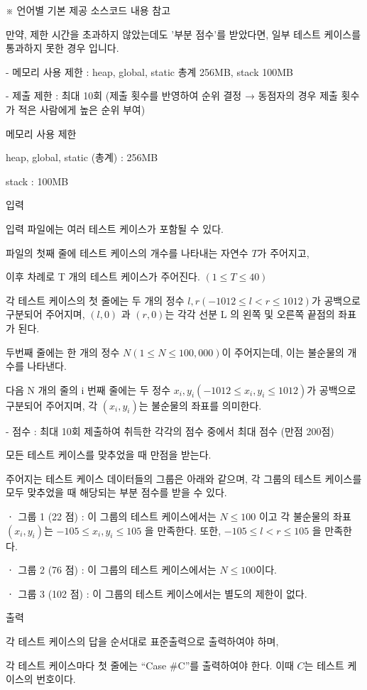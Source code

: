 \documentclass [12pt] {oblivoir}
\begin{document}
※ 언어별 기본 제공 소스코드 내용 참고

만약, 제한 시간을 초과하지 않았는데도 '부분 점수'를 받았다면, 일부 테스트 케이스를 통과하지 못한 경우 입니다.

- 메모리 사용 제한 : heap, global, static 총계 256MB, stack 100MB

- 제출 제한 : 최대 10회 (제출 횟수를 반영하여 순위 결정 → 동점자의 경우 제출 횟수가 적은 사람에게 높은 순위 부여)

메모리 사용 제한

heap, global, static (총계) : 256MB

stack : 100MB

입력

입력 파일에는 여러 테스트 케이스가 포함될 수 있다.

파일의 첫째 줄에 테스트 케이스의 개수를 나타내는 자연수 $T$가 주어지고,

이후 차례로  T 개의 테스트 케이스가 주어진다. $(1 \le T \le 40)$

각 테스트 케이스의 첫 줄에는 두 개의 정수 $l, r(-1012 \le l < r \le 1012)$가 공백으로 구분되어 주어지며, $(l, 0)$ 과 $(r, 0)$는 각각 선분 L 의 왼쪽 및 오른쪽 끝점의 좌표가 된다.

두번째 줄에는 한 개의 정수 $N(1 \le N \le 100,000)$이 주어지는데, 이는 불순물의 개수를 나타낸다.

다음 N 개의 줄의 i 번째 줄에는 두 정수 $x_{i}, y_{i}(-1012 \le x_{i}, y_{i} \le 1012)$가 공백으로 구분되어 주어지며, 각 $(x_{i}, y_{i})$는 불순물의 좌표를 의미한다.

- 점수 : 최대 10회 제출하여 취득한 각각의 점수 중에서 최대 점수 (만점 200점)

모든 테스트 케이스를 맞추었을 때 만점을 받는다.

주어지는 테스트 케이스 데이터들의 그룹은 아래와 같으며, 각 그룹의 테스트 케이스를 모두 맞추었을 때 해당되는 부분 점수를 받을 수 있다.

   ㆍ 그룹 1 (22 점) : 이 그룹의 테스트 케이스에서는 $N \le 100$ 이고 각 불순물의 좌표 $(x_{i}, y_{i})$는 $-105 \le x_{i}, y_{i} \le 105$ 을 만족한다. 또한, $-105 \le l < r \le 105$ 을 만족한다.

   ㆍ 그룹 2 (76 점) : 이 그룹의 테스트 케이스에서는 $N \le 100$이다.

   ㆍ 그룹 3 (102 점) : 이 그룹의 테스트 케이스에서는 별도의 제한이 없다.

출력

각 테스트 케이스의 답을 순서대로 표준출력으로 출력하여야 하며,

각 테스트 케이스마다 첫 줄에는 “Case \#C”를 출력하여야 한다. 이때 $C$는 테스트 케이스의 번호이다.
\end{document}
